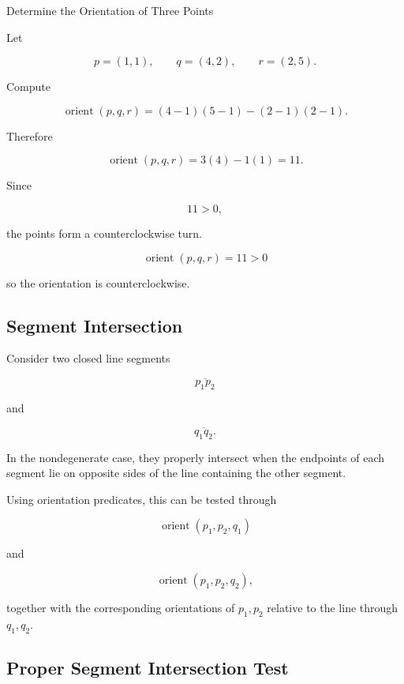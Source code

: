 \begin{workedexamplebox}{Determine the Orientation of Three Points}

Let

\[
p=(1,1),
\qquad
q=(4,2),
\qquad
r=(2,5).
\]

Compute

\[
\operatorname{orient}(p,q,r)
=
(4-1)(5-1)-(2-1)(2-1).
\]

Therefore

\[
\operatorname{orient}(p,q,r)
=
3(4)-1(1)
=
11.
\]

Since

\[
11>0,
\]

the points form a counterclockwise turn.

\begin{answerbox}
\[
\boxed{
\operatorname{orient}(p,q,r)=11>0
}
\]

so the orientation is counterclockwise.
\end{answerbox}
\end{workedexamplebox}

\subsection{Segment Intersection}
\label{subsec:segment-intersection}

Consider two closed line segments

\[
\overline{p_1p_2}
\]

and

\[
\overline{q_1q_2}.
\]

In the nondegenerate case, they properly intersect when the endpoints of
each segment lie on opposite sides of the line containing the other segment.

Using orientation predicates, this can be tested through

\[
\operatorname{orient}(p_1,p_2,q_1)
\]

and

\[
\operatorname{orient}(p_1,p_2,q_2),
\]

together with the corresponding orientations of \(p_1,p_2\) relative to
the line through \(q_1,q_2\).

\subsection{Proper Segment Intersection Test}
\label{subsec:proper-segment-intersection}

